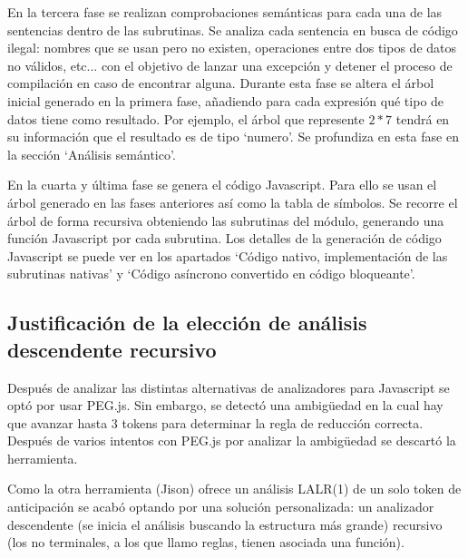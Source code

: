 \documentclass{report}
\begin{document}
	\vspace{10px}
	
	En la tercera fase se realizan comprobaciones semánticas para cada una de las sentencias dentro de las subrutinas. Se analiza cada sentencia en busca de código ilegal: nombres que se usan pero no existen, operaciones entre dos tipos de datos no válidos, etc... con el objetivo de lanzar una excepción y detener el proceso de compilación en caso de encontrar alguna. Durante esta fase se altera el árbol inicial generado en la primera fase, añadiendo para cada expresión qué tipo de datos tiene como resultado. Por ejemplo, el árbol que represente $2 * 7$ tendrá en su información que el resultado es de tipo `numero'.  Se profundiza en esta fase en la sección `Análisis semántico'.
	
	\vspace{10px}
	
	En la cuarta y última fase se genera el código Javascript. Para ello se usan el árbol generado en las fases anteriores así como la tabla de símbolos. Se recorre el árbol de forma recursiva obteniendo las subrutinas del módulo, generando una función Javascript por cada subrutina. Los detalles de la generación de código Javascript se puede ver en los apartados `Código nativo, implementación de las subrutinas nativas' y `Código asíncrono convertido en código bloqueante'.
	
	\subsection{Justificación de la elección de análisis descendente recursivo}
	
	
	Después de analizar las distintas alternativas de analizadores para Javascript se optó por usar PEG.js. Sin embargo, se detectó una ambigüedad en la cual hay que avanzar hasta 3 tokens para determinar la regla de reducción correcta. Después de varios intentos con PEG.js por analizar la ambigüedad se descartó la herramienta. 
	
	\vspace{10px}
	
	Como la otra herramienta (Jison) ofrece un análisis LALR(1) de un solo token de anticipación se acabó optando por una solución personalizada: un analizador descendente (se inicia el análisis buscando la estructura más grande) recursivo (los no terminales, a los que llamo reglas, tienen asociada una función). 
	
\end{document}

